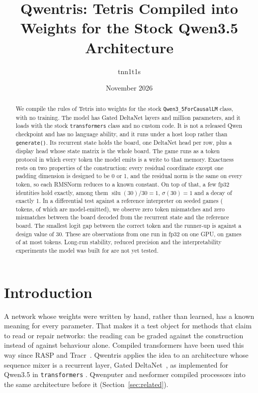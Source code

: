 \documentclass[11pt]{article}
\title{Qwentris: Tetris Compiled into Weights for the Stock Qwen3.5 Architecture}
\author{tnn1t1s}
\date{November 2026}
\newcommand{\silu}{\operatorname{silu}}
\begin{document}
\maketitle

\begin{abstract}
We compile the rules of Tetris into weights for the stock \texttt{Qwen3\_5ForCausalLM} class, with no training. The model has \nLayers{} Gated DeltaNet layers and \nParamsM{} million parameters, and it loads with the stock \texttt{transformers} class and no custom code. It is not a released Qwen checkpoint and has no language ability, and it runs under a host loop rather than \texttt{generate()}. Its recurrent state holds the board, one DeltaNet head per row, plus a display head whose state matrix is the whole board. The game runs as a token protocol in which every token the model emits is a write to that memory. Exactness rests on two properties of the construction: every residual coordinate except one padding dimension is designed to be 0 or 1, and the residual norm is the same on every token, so each RMSNorm reduces to a known constant. On top of that, a few fp32 identities hold exactly, among them $\silu(30)/30 = 1$, $\sigma(30) = 1$ and a decay of exactly 1. In a differential test against a reference interpreter on \nPtwoGames{} seeded games (\nPtwoTokens{} tokens, of which \nPtwoChecked{} are model-emitted), we observe zero token mismatches and zero mismatches between the board decoded from the recurrent state and the reference board. The smallest logit gap between the correct token and the runner-up is \nPtwoGap{} against a design value of 30. These are observations from one run in fp32 on one GPU, on games of at most \nPtwoMaxGameTokens{} tokens. Long-run stability, reduced precision and the interpretability experiments the model was built for are not yet tested.
\end{abstract}

\section{Introduction}

A network whose weights were written by hand, rather than learned, has a known meaning for every parameter. That makes it a test object for methods that claim to read or repair networks: the reading can be graded against the construction instead of against behaviour alone. Compiled transformers have been used this way since RASP and Tracr~\cite{weiss2021thinking,lindner2023tracr}. Qwentris applies the idea to an architecture whose sequence mixer is a recurrent layer, Gated DeltaNet~\cite{yang2024gated}, as implemented for Qwen3.5 in \texttt{transformers} \nTfVersion{}. Qwenputer and nesformer compiled processors into the same architecture before it (Section~\ref{sec:related}).
\end{document}
